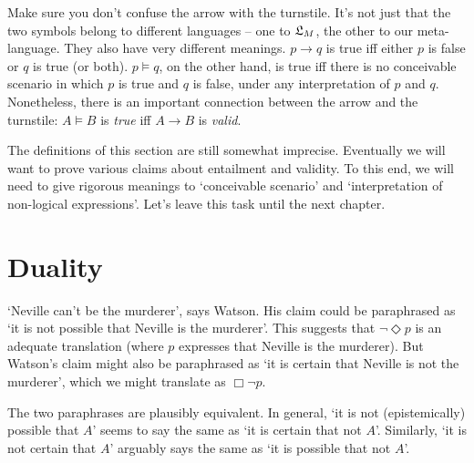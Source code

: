 Make sure you don't confuse the arrow with the turnstile. It's not just that the
two symbols belong to different languages -- one to $\mathfrak{L}_{M}$, the other to our
meta-language. They also have very different meanings. $p \to q$ is true iff
either $p$ is false or $q$ is true (or both). $p \models q$, on the other hand,
is true iff there is no conceivable scenario in which $p$ is true and $q$ is
false, under any interpretation of $p$ and $q$. Nonetheless, there is an
important connection between the arrow and the turnstile: $A \models B$ is
\emph{true} iff $A \to B$ is \emph{valid}.

The definitions of this section are still somewhat imprecise. Eventually we will
want to prove various claims about entailment and validity. To this end, we will
need to give rigorous meanings to `conceivable scenario' and `interpretation of
non-logical expressions'. Let's leave this task until the next chapter.


\section{Duality}%
\label{sec:duality}


`Neville can't be the murderer', says Watson. His claim could be paraphrased as
`it is not possible that Neville is the murderer'. This suggests that
$\neg\Diamond p$ is an adequate translation (where $p$ expresses that Neville is
the murderer). But Watson's claim might also be paraphrased as `it is certain
that Neville is not the murderer', which we might translate as $\Box\neg p$.


The two paraphrases are plausibly equivalent. In general, `it is not
(epistemically) possible that $A$' seems to say the same as `it is certain that
not $A$'. Similarly, `it is not certain that $A$' arguably says the same as `it
is possible that not $A$'.

